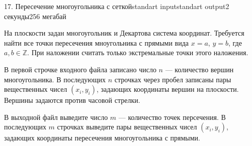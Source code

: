 \begin{problem}{17. Пересечение многоугольника с сеткой}{standart input}{standart output}{2 секунды}{256 мегабай}

На плоскости задан многоугольник и Декартова система координат. Требуется найти все точки пересечения мноугольника с прямыми вида $x = a$, $y = b$, где $a, b \in \mathbb Z$. При наложении считать только экстремальные точки этого наложения.

\InputFile

В первой строчке входного файла записано число $n$ --- количество вершин многоугольника. В последующих $n$ строчках через пробел записаны пары вещественных чисел $(x_i, y_i)$, задающих координаты вершин на плоскости. Вершины задаются против часовой стрелки.

\OutputFile

В выходной файл выведите число $m$ --- количество точек персечения. В последующих $m$ строчках выведите пары вещественных чисел $(x_i, y_i)$, задающих координаты пересечения многоугольника с прямыми.

\Examples

\begin{example}%
%
\end{example}

\end{problem}
